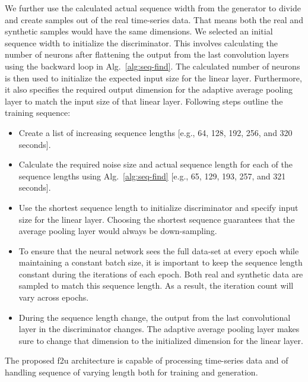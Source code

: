 We further use the calculated actual sequence width from the generator to divide and create samples out of the real time-series data. That means both the real and synthetic samples would have the same dimensions.  
%
We selected an initial sequence width to initialize the discriminator. This involves calculating the number of neurons after flattening the output from the last convolution layers using the backward loop in Alg.~\ref{alg:seq-find}. The calculated number of neurons is then used to initialize the expected input size for the linear layer. Furthermore, it also specifies the required output dimension for the adaptive average pooling layer to match the input size of that linear layer. Following steps outline the training sequence:
%
\begin{itemize}
\item Create a list of increasing sequence lengths [e.g., 64, 128, 192, 256, and 320 seconds]. 
\item Calculate the required noise size and actual sequence length for each of the sequence lengths using Alg.~\ref{alg:seq-find} [e.g., 65, 129, 193, 257, and 321 seconds].
\item Use the shortest sequence length to initialize discriminator and specify input size for the linear layer. Choosing the shortest sequence guarantees that the average pooling layer would always be down-sampling.
%
\item To ensure that the neural network sees the full data-set at every epoch while maintaining a constant batch size, it is important to keep the sequence length constant during the iterations of each epoch. Both real and synthetic data are sampled to match this sequence length. As a result, the iteration count will vary across epochs.
%
\item During the sequence length change, the output from the last convolutional layer in the discriminator changes. The adaptive average pooling layer makes sure to change that dimension to the initialized dimension for the linear layer.
\end{itemize}
%
The proposed \gls*{f2u} architecture is capable of processing time-series data and of handling sequence of varying length both for training and generation.

